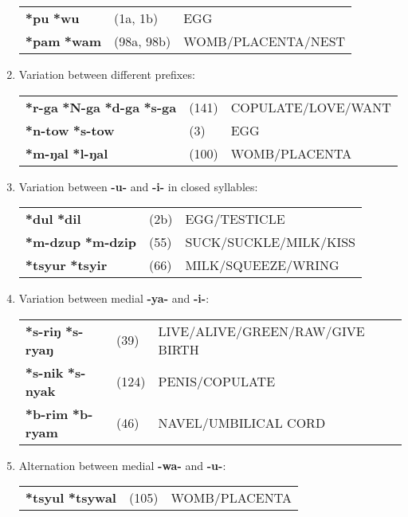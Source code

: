 \begin{enumerate}
\begin{tabular}{lll}
\textbf{*pu} \STEDTU{⪤} \textbf{*wu} 	&(1a, 1b)		&EGG\\
\textbf{*pam} \STEDTU{⪤} \textbf{*wam}	&(98a, 98b)	&WOMB/PLACENTA/NEST\\
\end{tabular}

\item %
Variation between different prefixes:

\begin{tabular}{lll}
\textbf{*r-ga} \STEDTU{⪤} \textbf{*N-ga} \STEDTU{⪤} \textbf{*d-ga} \STEDTU{⪤} \textbf{*s-ga} &(141)	&COPULATE/LOVE/WANT\\
\textbf{*n-tow} \STEDTU{⪤} \textbf{*s-tow} &(3)		&EGG\\
\textbf{*m-ŋal} \STEDTU{⪤} \textbf{*l-ŋal} &(100)		&WOMB/PLACENTA\\
\end{tabular}

\item %
Variation between \textbf{-u-} and \textbf{-i-} in closed syllables:

\begin{tabular}{lll}
\textbf{*dul} \STEDTU{⪤} \textbf{*dil} 		&(2b)	&EGG/TESTICLE\\
\textbf{*m-dzup} \STEDTU{⪤} \textbf{*m-dzip}	&(55)	&SUCK/SUCKLE/MILK/KISS\\
\textbf{*tsyur} \STEDTU{⪤} \textbf{*tsyir}	&(66)	&MILK/SQUEEZE/WRING\\
\end{tabular}

\item %
Variation between medial \textbf{-ya-} and \textbf{-i-}:

\begin{tabular}{lll}
\textbf{*s-riŋ} \STEDTU{⪤} \textbf{*s-ryaŋ} &(39)	&LIVE/ALIVE/GREEN/RAW/GIVE BIRTH\\
\textbf{*s-nik} \STEDTU{⪤} \textbf{*s-nyak} &(124)	&PENIS/COPULATE\\
\textbf{*b-rim} \STEDTU{⪤} \textbf{*b-ryam} &(46)	&NAVEL/UMBILICAL CORD\\
\end{tabular}

\item %
Alternation between medial \textbf{-wa-} and \textbf{-u-}:

\begin{tabular}{lll}
\textbf{*tsyul} \STEDTU{⪤} \textbf{*tsywal} &(105)	&WOMB/PLACENTA\\
\end{tabular}


\end{enumerate}
